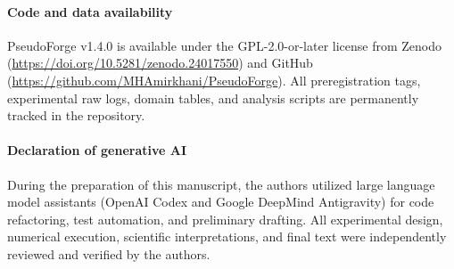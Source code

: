 \documentclass[3p,twocolumn]{elsarticle}
\begin{document}
\paragraph*{Code and data availability}
PseudoForge v1.4.0 is available under the GPL-2.0-or-later license from Zenodo (\url{https://doi.org/10.5281/zenodo.24017550}) and GitHub (\url{https://github.com/MHAmirkhani/PseudoForge}). All preregistration tags, experimental raw logs, domain tables, and analysis scripts are permanently tracked in the repository.

\paragraph*{Declaration of generative AI}
During the preparation of this manuscript, the authors utilized large language model assistants (OpenAI Codex and Google DeepMind Antigravity) for code refactoring, test automation, and preliminary drafting. All experimental design, numerical execution, scientific interpretations, and final text were independently reviewed and verified by the authors.

\begingroup\footnotesize\raggedright
\setlength{\bibsep}{0pt}


\endgroup
\end{document}
